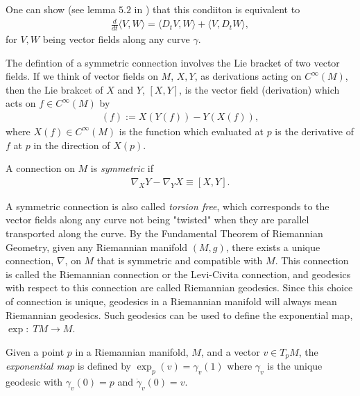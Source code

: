 One can show (see lemma $5.2$ in \cite{lee2006riemannian}) that this condiiton is equivalent to
\begin{align*}
\frac{d}{dt} \langle V, W \rangle = \langle D_t V, W \rangle + \langle V, D_t W \rangle,
\end{align*} 
for $V, W$ being vector fields along any curve $\gamma$.

The defintion of a symmetric connection involves the Lie bracket of two vector fields. If we think of vector fields on $M$, $X, Y$, as derivations acting on $C^\infty (M)$, then the Lie brakcet of $X$ and $Y$, $[X , Y]$, is the vector field (derivation) which acts on $f \in C^\infty (M)$ by
\begin{align*}
[X , Y] (f) := X(Y(f)) - Y(X(f)),
\end{align*}
where $X(f) \in C^\infty (M)$ is the function which evaluated at $p$ is the derivative of $f$ at $p$ in the direction of $X(p)$. 

\begin{definition}
A connection on $M$ is \textit{symmetric} if 
\begin{align*}
\nabla_X Y - \nabla_Y X \equiv [X, Y].
\end{align*}
\end{definition}

A symmetric connection is also called \textit{torsion free}, which corresponds to the vector fields along any curve not being "twisted" when they are parallel transported along the curve. By the Fundamental Theorem of Riemannian Geometry, given any Riemannian manifold $(M,g)$, there exists a unique connection, $\nabla$, on $M$ that is symmetric and compatible with $M$. This connection is called the Riemannian connection or the Levi-Civita connection, and geodesics with respect to this connection are called Riemannian geodesics. Since this choice of connection is unique, geodesics in a Riemannian manifold will always mean Riemannian geodesics. Such geodesics can be used to define the exponential map, $\exp: \; TM \rightarrow M$.  

\begin{definition}
Given a point $p$ in a Riemannian manifold, $M$, and a vector $v \in T_p M$, the \textit{exponential map} is defined by $\exp_p (v) = \gamma_v(1)$ where $\gamma_v$ is the unique geodesic with $\gamma_v(0) = p$ and $\dot{\gamma}_v(0) = v$.
\end{definition}

